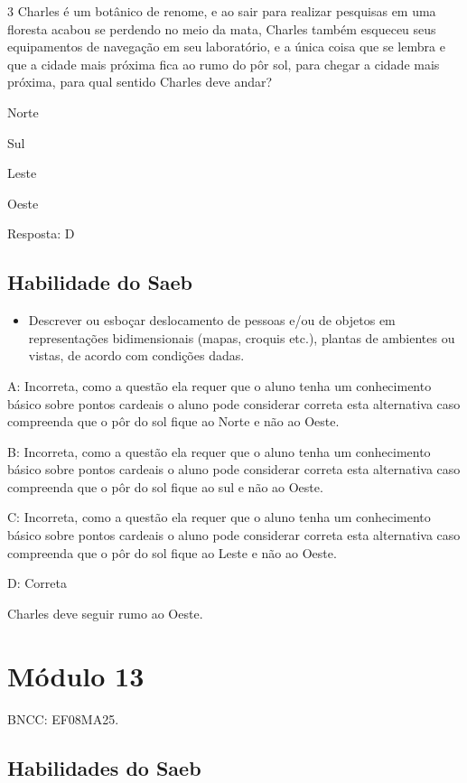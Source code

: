 \num{3} Charles é um botânico de renome, e ao sair para realizar pesquisas em
uma floresta acabou se perdendo no meio da mata, Charles também esqueceu
seus equipamentos de navegação em seu laboratório, e a única coisa que
se lembra e que a cidade mais próxima fica ao rumo do pôr sol, para
chegar a cidade mais próxima, para qual sentido Charles deve andar?

\item Norte
\item Sul
\item Leste
\item Oeste

Resposta: D

\section{Habilidade do Saeb}

\begin{itemize}
\tightlist

\item 
  Descrever ou esboçar deslocamento de pessoas e/ou de objetos em
  representações bidimensionais (mapas, croquis etc.), plantas de
  ambientes ou vistas, de acordo com condições dadas.
\end{itemize}

A: Incorreta, como a questão ela requer que o aluno tenha um
conhecimento básico sobre pontos cardeais o aluno pode considerar
correta esta alternativa caso compreenda que o pôr do sol fique ao Norte
e não ao Oeste.

B: Incorreta, como a questão ela requer que o aluno tenha um
conhecimento básico sobre pontos cardeais o aluno pode considerar
correta esta alternativa caso compreenda que o pôr do sol fique ao sul e
não ao Oeste.

C: Incorreta, como a questão ela requer que o aluno tenha um
conhecimento básico sobre pontos cardeais o aluno pode considerar
correta esta alternativa caso compreenda que o pôr do sol fique ao Leste
e não ao Oeste.

D: Correta

Charles deve seguir rumo ao Oeste.

\chapter{Módulo 13}

BNCC: EF08MA25.

\section{Habilidades do Saeb}

